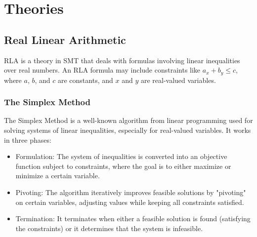 \documentclass[10pt,a4paper]{report}
\begin{document}
\section{Theories}
\subsection{Real Linear Arithmetic}
RLA is a theory in SMT that deals with formulas involving linear inequalities over real numbers. An RLA formula may include constraints like $a_x + b_y \leq c$, where $a$, $b$, and $c$ are constants, and $x$ and $y$ are real-valued variables.
\subsubsection{The Simplex Method}
The Simplex Method is a well-known algorithm from linear programming used for solving systems of linear inequalities, especially for real-valued variables. It works in three phases:
\begin{itemize}
    \item Formulation: The system of inequalities is converted into an objective function subject to constraints, where the goal is to either maximize or minimize a certain variable.
    \item Pivoting: The algorithm iteratively improves feasible solutions by "pivoting" on certain variables, adjusting values while keeping all constraints satisfied.
    \item Termination: It terminates when either a feasible solution is found (satisfying the constraints) or it determines that the system is infeasible.
\end{itemize}
\end{document}
